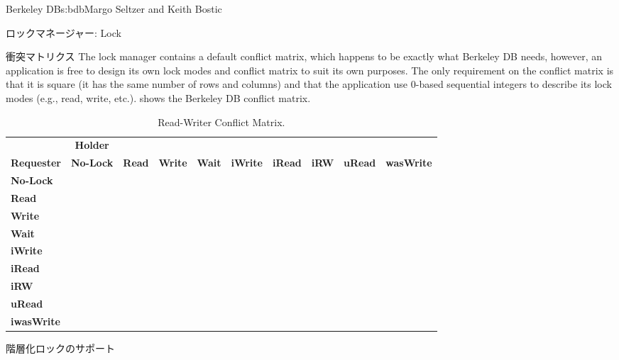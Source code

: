 \begin{aosachapter}{Berkeley DB}{s:bdb}{Margo Seltzer and Keith Bostic}
\begin{aosasect1}{ロックマネージャー: Lock}
\begin{aosasect2}{衝突マトリクス}
The lock manager contains a default conflict matrix, which happens to
be exactly what Berkeley DB needs, however, an application is free to
design its own lock modes and conflict matrix to suit its own
purposes.  The only requirement on the conflict matrix is that it is
square (it has the same number of rows and columns) and that the
application use 0-based sequential integers to describe its lock
modes (e.g., read, write, etc.).   
 shows the Berkeley DB conflict matrix.

\begin{table}[h]\small\centering
\begin{tabular} { | l | c | c | c | c | c | c | c | c | c | }
\hline
& {\bf Holder} & & & & & & & & \\
{\bf Requester} & {\bf No-Lock}	& {\bf Read} & {\bf Write} & {\bf Wait}	& {\bf iWrite} & {\bf iRead} & {\bf iRW} & {\bf uRead} & {\bf wasWrite}\\
\hline
{\bf No-Lock}	&	&	& &	& & &	& & \\
\hline
{\bf Read}	& 		& 		& \checkmark & 		& \checkmark   & 	     & \checkmark & 	       & \checkmark\\
\hline
{\bf Write}	& 		& \checkmark	& \checkmark & \checkmark & \checkmark & \checkmark   & \checkmark & \checkmark	& \checkmark\\
\hline
{\bf Wait}	& 		& 		& 	   & 		& 	       & 	     & 	 	& 	       & \\
\hline
{\bf iWrite}	& 		& \checkmark	& \checkmark & 		& 	       & 	     & 	 	& \checkmark   & \checkmark\\
\hline
{\bf iRead}	& 		& 		& \checkmark & 		& 	       & 	     & 	 	& 	       & \checkmark\\
\hline
{\bf iRW}	& 		& \checkmark	& \checkmark & 		& 	       & 	     & 	 	& \checkmark   & \checkmark\\
\hline
{\bf uRead}	& 		& 		& \checkmark & 		& \checkmark   & 	     & \checkmark & 	       & \\
\hline
{\bf iwasWrite}	& 		& \checkmark	& \checkmark & 		& \checkmark   & \checkmark  & \checkmark & 	       & \checkmark\\
\hline
\end{tabular}
\caption{Read-Writer Conflict Matrix.}
\label{tbl.bdb.two}
\end{table}

\end{aosasect2}

\begin{aosasect2}{階層化ロックのサポート}


\end{aosasect2}
\end{aosasect1}
\end{aosachapter}
